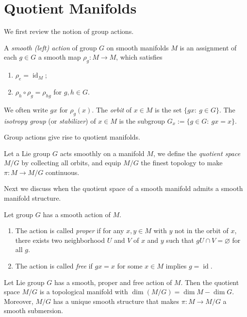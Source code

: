 \section{Quotient Manifolds}

We first review the notion of group actions.
\begin{defn}
    A \emph{smooth (left) action} of group $G$ on smooth manifolds $M$ is an assignment of each $g\in G$ a smooth map $\rho_g:M\to M$, which satisfies
    \begin{enumerate}[(1)]
        \item $\rho_e=\operatorname{id}_M$;
        \item $\rho_h\circ\rho_g=\rho_{hg}$ for $g,h\in G$.
    \end{enumerate}
    We often write $gx$ for $\rho_g(x)$.
    The \emph{orbit} of $x\in M$ is the set $\{gx:\ g\in G\}$.
    The \emph{isotropy group} (or \emph{stabilizer}) of $x\in M$ is the subgroup $G_x:=\{g\in G:\ gx=x\}$.
\end{defn}

Group actions give rise to quotient manifolds.
\begin{defn}
    Let a Lie group $G$ acts smoothly on a manifold $M$, we define the \emph{quotient space} $M/G$ by collecting all orbits, and equip $M/G$ the finest topology to make $\pi:M\to M/G$ continuous.
\end{defn}

Next we discuss when the quotient space of a smooth manifold admits a smooth manifold structure.
\begin{defn}Let group $G$ has a smooth action of $M$.
    \begin{enumerate}[(1)]
        \item The action is called \emph{proper} if for any $x,y\in M$ with $y$ not in the orbit of $x$, there exists two neighborhood $U$ and $V$ of $x$ and $y$ such that $gU\cap V=\varnothing$ for all $g$.
        \item The action is called \emph{free} if $gx=x$ for some $x\in M$ implies $g=\operatorname{id}$.
    \end{enumerate}
\end{defn}

\begin{thm}
    Let Lie group $G$ has a smooth, proper and free action of $M$.
    Then the quotient space $M/G$ is a topological manifold with $\dim(M/G)=\dim{M}-\dim{G}$.
    Moreover, $M/G$ has a unique smooth structure that makes $\pi:M\to M/G$ a smooth submersion.
\end{thm}

